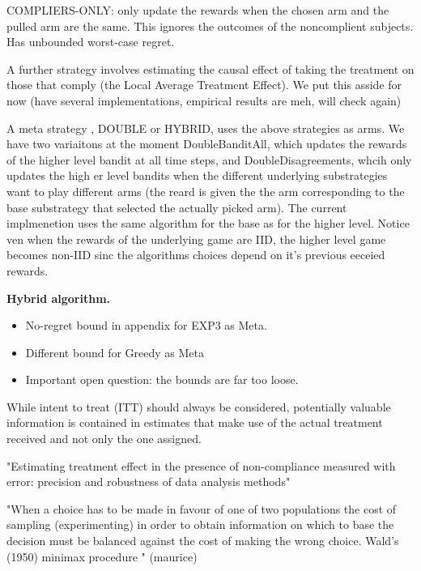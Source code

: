 COMPLIERS-ONLY: only update the rewards when the chosen arm and the pulled arm are the same. This ignores the outcomes of the noncomplient subjects. Has unbounded worst-case regret.

A further strategy involves estimating the causal effect of taking the treatment on those that comply (the Local Average Treatment Effect). We put this asside for now (have several implementations, empirical results are meh, will check again)

A meta strategy , DOUBLE or HYBRID, uses the above strategies as arms. We have two variaitons at the moment DoubleBanditAll, which updates the rewards of the higher level bandit at all time steps, and DoubleDisagreements, whcih only updates the high er level bandits when the different underlying substrategies want to play different arms (the reard is given the the arm corresponding to the base substrategy that selected the actually picked arm).
The current implmenetion uses the same algorithm for the base as for the higher level. Notice ven when the rewards of the underlying game are IID, the higher level game becomes non-IID sinc the algorithms choices depend on it's previous eeceied rewards. 

 \textbf{Hybrid algorithm.}
	\begin{itemize}
		\item No-regret bound in appendix for EXP3 as Meta. 
		\item Different bound for Greedy as Meta
		\item Important open question: the bounds are far too loose.
	\end{itemize}


While intent to treat (ITT) should always be considered, potentially valuable information is contained in estimates that make use of the actual treatment received and not only the one assigned.
 \cite{shrier:13}




"Estimating treatment effect in the presence of non-compliance measured with error: precision and robustness of data analysis methods" \cite{kenna:04}


"When a choice has to be made in favour of one of two populations the cost of sampling 
(experimenting) in order to obtain information on which to base the decision must be balanced against the cost of making the wrong choice. Wald's (1950) minimax procedure " (maurice)

